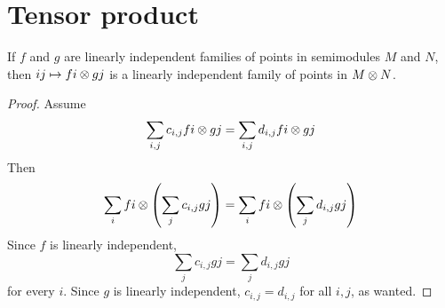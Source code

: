 \section{Tensor product}


\begin{lemma}
  \label{0-tensor-lin-indep}
  \uses{}
  \leanok

  If $f$ and $g$ are linearly independent families of points in semimodules $M$ and $N$, then $i j \mapsto f i \otimes g j$ is a linearly independent family of points in $M \otimes N$.
\end{lemma}
\begin{proof}
  \uses{}

  Assume
  \[
    \sum_{i, j} c_{i, j} f i \otimes g j = \sum_{i, j} d_{i, j} f i \otimes g j
  \]
  Then
  \[
    \sum_i f i \otimes \left(\sum_j c_{i, j} g j\right) = \sum_i f i \otimes \left(\sum_j d_{i, j} g j\right)
  \]
  Since $f$ is linearly independent,
  \[
    \sum_j c_{i, j} g j = \sum_j d_{i, j} g j
  \]
  for every $i$. Since $g$ is linearly independent, $c_{i, j} = d_{i, j}$ for all $i, j$, as wanted.
\end{proof}
